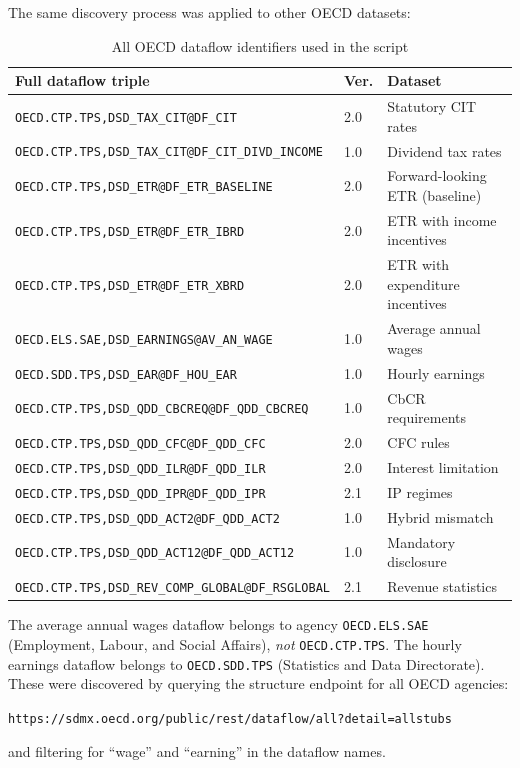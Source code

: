 \documentclass[12pt,a4paper]{article}
\begin{document}
The same discovery process was applied to other OECD datasets:

\begin{table}[H]
\centering
\caption{All OECD dataflow identifiers used in the script}
\label{tab:oecd_all_flows}
\small
\begin{tabular}{lll}
\toprule
\textbf{Full dataflow triple} & \textbf{Ver.} & \textbf{Dataset} \\
\midrule
\texttt{OECD.CTP.TPS,DSD\_TAX\_CIT@DF\_CIT} & 2.0 & Statutory CIT rates \\
\texttt{OECD.CTP.TPS,DSD\_TAX\_CIT@DF\_CIT\_DIVD\_INCOME} & 1.0 & Dividend tax rates \\
\texttt{OECD.CTP.TPS,DSD\_ETR@DF\_ETR\_BASELINE} & 2.0 & Forward-looking ETR (baseline) \\
\texttt{OECD.CTP.TPS,DSD\_ETR@DF\_ETR\_IBRD} & 2.0 & ETR with income incentives \\
\texttt{OECD.CTP.TPS,DSD\_ETR@DF\_ETR\_XBRD} & 2.0 & ETR with expenditure incentives \\
\texttt{OECD.ELS.SAE,DSD\_EARNINGS@AV\_AN\_WAGE} & 1.0 & Average annual wages \\
\texttt{OECD.SDD.TPS,DSD\_EAR@DF\_HOU\_EAR} & 1.0 & Hourly earnings \\
\texttt{OECD.CTP.TPS,DSD\_QDD\_CBCREQ@DF\_QDD\_CBCREQ} & 1.0 & CbCR requirements \\
\texttt{OECD.CTP.TPS,DSD\_QDD\_CFC@DF\_QDD\_CFC} & 2.0 & CFC rules \\
\texttt{OECD.CTP.TPS,DSD\_QDD\_ILR@DF\_QDD\_ILR} & 2.0 & Interest limitation \\
\texttt{OECD.CTP.TPS,DSD\_QDD\_IPR@DF\_QDD\_IPR} & 2.1 & IP regimes \\
\texttt{OECD.CTP.TPS,DSD\_QDD\_ACT2@DF\_QDD\_ACT2} & 1.0 & Hybrid mismatch \\
\texttt{OECD.CTP.TPS,DSD\_QDD\_ACT12@DF\_QDD\_ACT12} & 1.0 & Mandatory disclosure \\
\texttt{OECD.CTP.TPS,DSD\_REV\_COMP\_GLOBAL@DF\_RSGLOBAL} & 2.1 & Revenue statistics \\
\bottomrule
\end{tabular}
\end{table}

\begin{warningbox}
The average annual wages dataflow belongs to agency \texttt{OECD.ELS.SAE} (Employment, Labour, and Social Affairs), \emph{not} \texttt{OECD.CTP.TPS}.
The hourly earnings dataflow belongs to \texttt{OECD.SDD.TPS} (Statistics and Data Directorate).
These were discovered by querying the structure endpoint for all OECD agencies:
\begin{center}
\small\texttt{https://sdmx.oecd.org/public/rest/dataflow/all?detail=allstubs}
\end{center}
and filtering for ``wage'' and ``earning'' in the dataflow names.
\end{warningbox}
\end{document}
